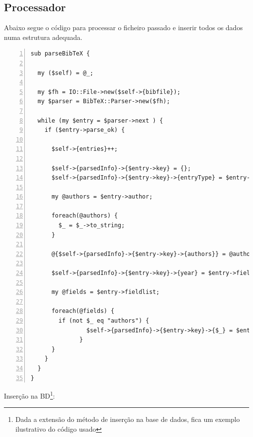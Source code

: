 \documentclass[a4paper,11pt,openright,openbib]{article}
\begin{document}
\subsection{Processador}
Abaixo segue o código para processar o ficheiro passado e inserir todos os dados numa estrutura adequada.

\lstset{language=Perl}
\lstset{basicstyle=\ttfamily\footnotesize}
\lstset{commentstyle=\textit}
\lstset{breaklines=true}
\begin{lstlisting}[numbers=left]
sub parseBibTeX {

  my ($self) = @_;

  my $fh = IO::File->new($self->{bibfile});
  my $parser = BibTeX::Parser->new($fh);

  while (my $entry = $parser->next ) {
    if ($entry->parse_ok) {
      
      $self->{entries}++;
      
      $self->{parsedInfo}->{$entry->key} = {};
      $self->{parsedInfo}->{$entry->key}->{entryType} = $entry->type;
      
      my @authors = $entry->author;     

      foreach(@authors) {
        $_ = $_->to_string;       
      }
            
      @{$self->{parsedInfo}->{$entry->key}->{authors}} = @authors;
      
      $self->{parsedInfo}->{$entry->key}->{year} = $entry->field("year");

      my @fields = $entry->fieldlist;

      foreach(@fields) {
        if (not $_ eq "authors") {
                $self->{parsedInfo}->{$entry->key}->{$_} = $entry->field($_);
              }
      }
    }
  }
}
\end{lstlisting}
Inserção na BD\footnote{Dada a extensão do método de inserção na base de dados, fica um exemplo ilustrativo do código usado}:\\
\lstset{language=Perl}
\lstset{basicstyle=\ttfamily\footnotesize}
\lstset{commentstyle=\textit}
\lstset{breaklines=true}
\end{document}
